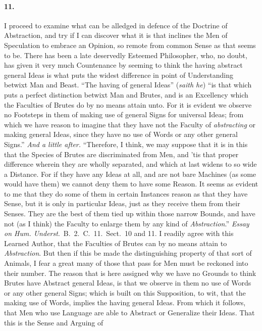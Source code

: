 \documentclass[]{article}
\newenvironment{sectionbody}{\begin{multicols}{2}}{\end{multicols}}
\begin{document}
\begin{sectionbody}
\paragraph{11.} I proceed to examine what can be alledged in defence of the
Doctrine of Abstraction, and try if I can discover what it is
that inclines the Men of Speculation to embrace an Opinion, so
remote from common Sense as that seems to be.  There has been a
late deservedly Esteemed Philosopher, who, no doubt, has given it
very much Countenance by seeming to think the having abstract
general Ideas is what puts the widest difference in point of
Understanding betwixt Man and Beast. ``The having of general
Ideas'' (\emph{saith he}) ``is that which puts a perfect
distinction betwixt Man and Brutes, and is an Excellency which
the Faculties of Brutes do by no means attain unto.  For it is
evident we observe no Footsteps in them of making use of general
Signs for universal Ideas; from which we have reason to imagine
that they have not the Faculty of \emph{abstracting} or making
general Ideas, since they have no use of Words or any other
general Signs.'' \emph{And a little after.} ``Therefore, I
think, we may suppose that it is in this that the Species of
Brutes are discriminated from Men, and 'tis that proper
difference wherein they are wholly separated, and which at last
widens to so wide a Distance.  For if they have any Ideas at
all, and are not bare Machines (as some would have them) we
cannot deny them to have some Reason.  It seems as evident to me
that they do some of them in certain Instances reason as that
they have Sense, but it is only in particular Ideas, just as they
receive them from their Senses.  They are the best of them tied
up within those narrow Bounds, and have not (as I think) the
Faculty to enlarge them by any kind of \emph{Abstraction}.''
\emph{Essay on Hum.  Underst}.\ B.~2.\ C.~11.\ Sect.\ 10 and 11.
I readily agree with this Learned Author, that the Faculties of
Brutes can by no means attain to \emph{Abstraction}.  But then
if this be made the distinguishing property of that sort of
Animals, I fear a great many of those that pass for Men must be
reckoned into their number.  The reason that is here assigned why
we have no Grounds to think Brutes have Abstract general Ideas,
is that we observe in them no use of Words or any other general
Signs; which is built on this Supposition, to wit, that the
making use of Words, implies the having general Ideas.  From
which it follows, that Men who use Language are able to Abstract
or Generalize their Ideas.  That this is the Sense and Arguing of

\end{sectionbody}
\end{document}
